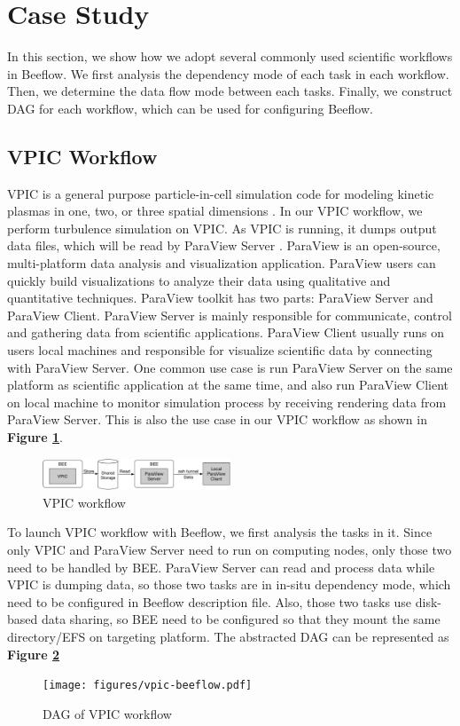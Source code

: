 \section{Case Study}
In this section, we show how we adopt several commonly used scientific workflows in Beeflow. We first analysis the dependency mode of each task in each workflow. Then, we determine the data flow mode between each tasks. Finally, we construct DAG for each workflow, which can be used for configuring Beeflow.
\subsection{VPIC Workflow}
VPIC is a general purpose particle-in-cell simulation code for modeling kinetic plasmas in one, two, or three spatial dimensions \cite{bowers20080, bowers2008ultrahigh, bowers2009advances}. In our VPIC workflow, we perform turbulence simulation on VPIC. As VPIC is running, it dumps output data files, which will be read by ParaView Server \cite{ahrens2005paraview, ayachit2015paraview}. ParaView is an open-source, multi-platform data analysis and visualization application. ParaView users can quickly build visualizations to analyze their data using qualitative and quantitative techniques. ParaView toolkit has two parts: ParaView Server and ParaView Client. ParaView Server is mainly responsible for communicate, control and gathering data from scientific applications. ParaView Client usually runs on users local machines and responsible for visualize scientific data by connecting with ParaView Server. One common use case is run ParaView Server on the same platform as scientific application at the same time, and also run ParaView Client on local machine to monitor simulation process by receiving rendering data from ParaView Server. This is also the use case in our VPIC workflow as shown in \textbf{Figure \ref{vpic-wf}}. 
\begin{figure}[h]
    \centering
    \caption{VPIC workflow}
    \label{vpic-wf}
    \includegraphics[width=0.5\textwidth]{figures/vpic.pdf}
\end{figure}
To launch VPIC workflow with Beeflow, we first analysis the tasks in it. Since only VPIC and ParaView Server need to run on computing nodes, only those two need to be handled by BEE. ParaView Server can read and process data while VPIC is dumping data, so those two tasks are in in-situ dependency mode, which need to be configured in Beeflow description file. Also, those two tasks use disk-based data sharing, so BEE need to be configured so that they mount the same directory/EFS on targeting platform. The abstracted DAG can be represented as \textbf{Figure \ref{vpic-dag}}
\begin{figure}[h]
    \centering
    \caption{DAG of VPIC workflow}
    \label{vpic-dag}
    \texttt{[image: figures/vpic-beeflow.pdf]}
\end{figure}

